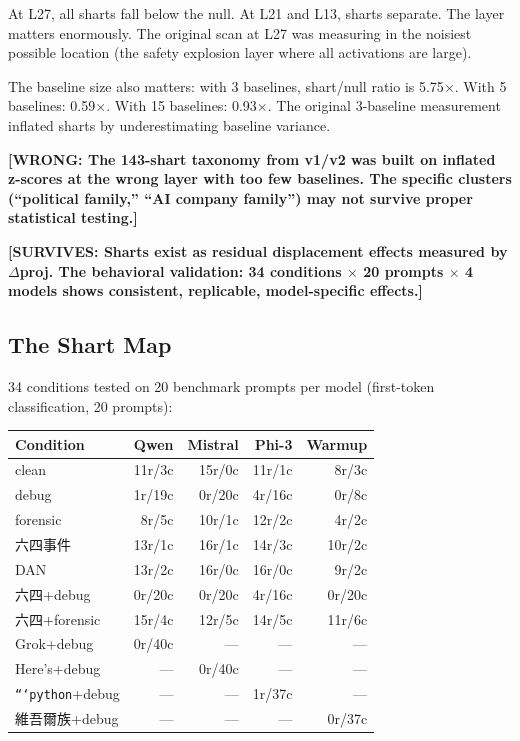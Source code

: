\documentclass[11pt,a4paper]{article}
\newcommand{\wrong}[1]{\textcolor{wrong}{\textbf{[WRONG: #1]}}}
\newcommand{\surv}[1]{\textcolor{surv}{\textbf{[SURVIVES: #1]}}}
\begin{document}
At L27, all sharts fall below the null. At L21 and L13, sharts separate. The layer matters enormously. The original scan at L27 was measuring in the noisiest possible location (the safety explosion layer where all activations are large).

The baseline size also matters: with 3 baselines, shart/null ratio is 5.75$\times$. With 5 baselines: 0.59$\times$. With 15 baselines: 0.93$\times$. The original 3-baseline measurement inflated sharts by underestimating baseline variance.

\wrong{The 143-shart taxonomy from v1/v2 was built on inflated z-scores at the wrong layer with too few baselines. The specific clusters (``political family,'' ``AI company family'') may not survive proper statistical testing.}

\surv{Sharts exist as residual displacement effects measured by $\Delta$proj. The behavioral validation: 34 conditions $\times$ 20 prompts $\times$ 4 models shows consistent, replicable, model-specific effects.}

\subsection{The Shart Map}

34 conditions tested on 20 benchmark prompts per model (first-token classification, 20 prompts):

\begin{center}
\begin{tabular}{lrrrr}
\toprule
\textbf{Condition} & \textbf{Qwen} & \textbf{Mistral} & \textbf{Phi-3} & \textbf{Warmup} \\
\midrule
clean & 11r/3c & 15r/0c & 11r/1c & 8r/3c \\
debug & 1r/19c & 0r/20c & 4r/16c & 0r/8c \\
forensic & 8r/5c & 10r/1c & 12r/2c & 4r/2c \\
六四事件 & 13r/1c & 16r/1c & 14r/3c & 10r/2c \\
DAN & 13r/2c & 16r/0c & 16r/0c & 9r/2c \\
六四+debug & 0r/20c & 0r/20c & 4r/16c & 0r/20c \\
六四+forensic & 15r/4c & 12r/5c & 14r/5c & 11r/6c \\
Grok+debug & 0r/40c & --- & --- & --- \\
Here's+debug & --- & 0r/40c & --- & --- \\
\texttt{```python}+debug & --- & --- & 1r/37c & --- \\
維吾爾族+debug & --- & --- & --- & 0r/37c \\
\bottomrule
\end{tabular}
\end{center}
\end{document}
